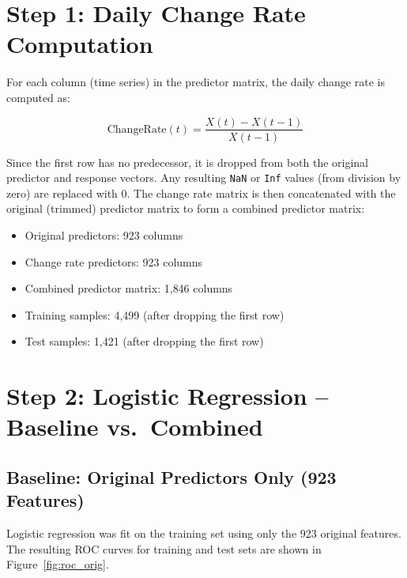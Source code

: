 \documentclass[12pt]{article}
\begin{document}
	\newpage
	\section{Step 1: Daily Change Rate Computation}\label{sec:changerate}

	For each column (time series) in the predictor matrix, the daily change rate is computed as:

	\begin{equation}
		\text{ChangeRate}(t) = \frac{X(t) - X(t-1)}{X(t-1)}
	\end{equation}

	Since the first row has no predecessor, it is dropped from both the original predictor and response vectors. Any resulting \texttt{NaN} or \texttt{Inf} values (from division by zero) are replaced with 0. The change rate matrix is then concatenated with the original (trimmed) predictor matrix to form a combined predictor matrix:

	\begin{itemize}
		\item Original predictors: 923 columns
		\item Change rate predictors: 923 columns
		\item Combined predictor matrix: 1{,}846 columns
		\item Training samples: 4{,}499 (after dropping the first row)
		\item Test samples: 1{,}421 (after dropping the first row)
	\end{itemize}

	\newpage
	\section{Step 2: Logistic Regression -- Baseline vs.\ Combined}\label{sec:logreg}

	\subsection{Baseline: Original Predictors Only (923 Features)}

	Logistic regression was fit on the training set using only the 923 original features. The resulting ROC curves for training and test sets are shown in Figure~\ref{fig:roc_orig}.
\end{document}
